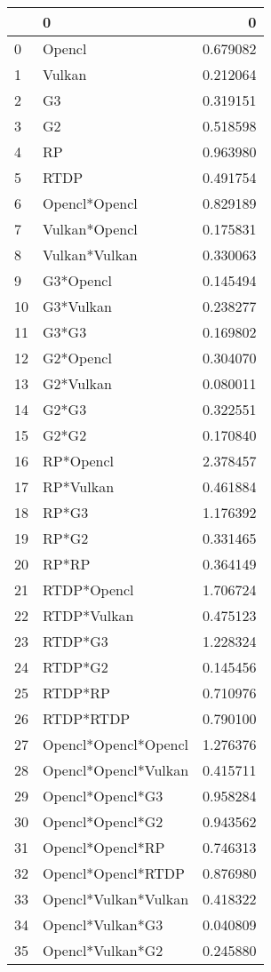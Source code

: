 \begin{tabular}{llr}
\toprule
 & 0 & 0 \\
\midrule
0 & Opencl & 0.679082 \\
1 & Vulkan & 0.212064 \\
2 & G3 & 0.319151 \\
3 & G2 & 0.518598 \\
4 & RP & 0.963980 \\
5 & RTDP & 0.491754 \\
6 & Opencl*Opencl & 0.829189 \\
7 & Vulkan*Opencl & 0.175831 \\
8 & Vulkan*Vulkan & 0.330063 \\
9 & G3*Opencl & 0.145494 \\
10 & G3*Vulkan & 0.238277 \\
11 & G3*G3 & 0.169802 \\
12 & G2*Opencl & 0.304070 \\
13 & G2*Vulkan & 0.080011 \\
14 & G2*G3 & 0.322551 \\
15 & G2*G2 & 0.170840 \\
16 & RP*Opencl & 2.378457 \\
17 & RP*Vulkan & 0.461884 \\
18 & RP*G3 & 1.176392 \\
19 & RP*G2 & 0.331465 \\
20 & RP*RP & 0.364149 \\
21 & RTDP*Opencl & 1.706724 \\
22 & RTDP*Vulkan & 0.475123 \\
23 & RTDP*G3 & 1.228324 \\
24 & RTDP*G2 & 0.145456 \\
25 & RTDP*RP & 0.710976 \\
26 & RTDP*RTDP & 0.790100 \\
27 & Opencl*Opencl*Opencl & 1.276376 \\
28 & Opencl*Opencl*Vulkan & 0.415711 \\
29 & Opencl*Opencl*G3 & 0.958284 \\
30 & Opencl*Opencl*G2 & 0.943562 \\
31 & Opencl*Opencl*RP & 0.746313 \\
32 & Opencl*Opencl*RTDP & 0.876980 \\
33 & Opencl*Vulkan*Vulkan & 0.418322 \\
34 & Opencl*Vulkan*G3 & 0.040809 \\
35 & Opencl*Vulkan*G2 & 0.245880 \\

\end{tabular}
